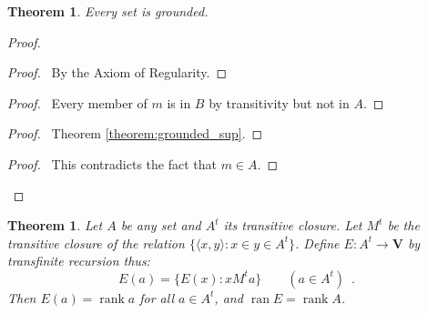 \documentclass{report}
\let\qed\relax
\newtheorem{theorem}[axiom]{Theorem}
\theoremstyle{definition}
\newcommand{\ran}{\ensuremath{\operatorname{ran}}}
\newcommand{\rank}{\ensuremath{\operatorname{rank}}}
\begin{document}
    \begin{theorem}
        Every set is grounded.
    \end{theorem}
    
    \begin{proof}
        \pf
            \begin{proof}
                \pf\ By the Axiom of Regularity.
            \end{proof}
            \begin{proof}
                \pf\ Every member of $m$ is in $B$ by transitivity but not in $A$.
            \end{proof}
            \begin{proof}
                \pf\ Theorem \ref{theorem:grounded_sup}.
            \end{proof}
            \qedstep
            \begin{proof}
                \pf\ This contradicts the fact that $m \in A$.
            \end{proof}
        \qed
    \end{proof}

    \begin{theorem}
        Let $A$ be any set and $A^t$ its transitive closure. Let $M^t$
        be the transitive closure of the relation $\{ \langle x,y \rangle : x \in y \in A^t \}$.
        Define $E : A^t \rightarrow \mathbf{V}$
        by transfinite recursion thus:
        \[ E(a) = \{ E(x) : x M^t a \} \qquad (a \in A^t) \enspace . \]
        Then $E(a) = \rank a$ for all $a \in A^t$, and $\ran E = \rank A$.
    \end{theorem}
\end{document}
